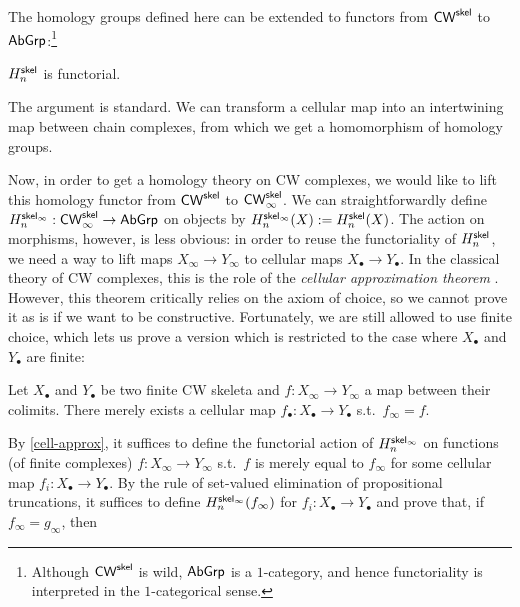 \documentclass[a4page]{article}
\begin{document}
The homology groups defined here can be extended to functors from \( \textnormal{\ensuremath{\mathsf{CW}^{\mathsf{skel}}}} \)
to \( \textnormal{\ensuremath{\mathsf{AbGrp}}} \):\footnote{Although \( \textnormal{\ensuremath{\mathsf{CW}^{\mathsf{skel}}}} \) is wild, \( \textnormal{\ensuremath{\mathsf{AbGrp}}} \) is a $1$-category, and hence functoriality is interpreted in the $1$-categorical sense.}
%
\begin{proposition}
  $\textnormal{\ensuremath{H^{\mathsf{skel}}_{n}}}$ is functorial.
\end{proposition}
The argument is standard. We can transform a cellular map into an intertwining map
  between chain complexes, from which we get a homomorphism of homology groups.

Now, in order to get a homology theory on CW complexes, we would like to lift
this homology functor from $\textnormal{\ensuremath{\mathsf{CW}^{\mathsf{skel}}}}$ to $\textnormal{\ensuremath{\mathsf{CW}_\infty^{\mathsf{skel}}}}$.
%
We can straightforwardly define $\textnormal{\ensuremath{H^{\mathsf{skel}_\infty}_{n}}} : \textnormal{\ensuremath{\mathsf{CW}_\infty^{\mathsf{skel}}}} \to \textnormal{\ensuremath{\mathsf{AbGrp}}}$ on
objects by $\textnormal{\ensuremath{H^{\mathsf{skel}_\infty}_{n}}}(X) := H_n^{\mathsf{skel}}(X)$. The action on
morphisms, however, is less obvious: in order to reuse the functoriality of $\textnormal{\ensuremath{H^{\mathsf{skel}}_{n}}}$,
we need a way to lift maps $X_\infty \to Y_\infty$ to cellular maps
$X_\bullet \to Y_\bullet$.
%
In the classical theory of CW complexes, this is the role of the \emph{cellular
approximation theorem} \cite[Section 10.4]{May1999}.
%
However, this theorem critically relies on the axiom of choice, so we cannot prove it as is if we want to be constructive.
%
Fortunately, we are still allowed to use finite choice, which lets us prove a
version which is restricted to the case where $X_\bullet$ and $Y_\bullet$ are
finite:
%
\begin{theorem}\label{cell-approx}
  Let $X_\bullet$ and $Y_\bullet$ be two finite CW skeleta and
  $f : X_{\infty} \to Y_{\infty}$ a map between their colimits.
  There merely exists a cellular map $f_\bullet : X_\bullet \to Y_\bullet$ s.t.\ $f_\infty = f$.
\end{theorem}
%
By \cref{cell-approx}, it suffices to define the functorial action of
$\textnormal{\ensuremath{H^{\mathsf{skel}_\infty}_{n}}}$ on functions (of finite complexes) $f : X_\infty \to Y_\infty$
s.t.\ $f$ is merely equal to $f_\infty$ for some cellular map
$f_i : X_\bullet \to Y_\bullet$.
%
By the rule of set-valued elimination of propositional truncations, it
suffices to define $\textnormal{\ensuremath{H^{\mathsf{skel}_\infty}_{n}}}(f_\infty)$ for $f_i : X_\bullet \to Y_\bullet$
and prove that, if $f_\infty = g_\infty$, then
\end{document}
